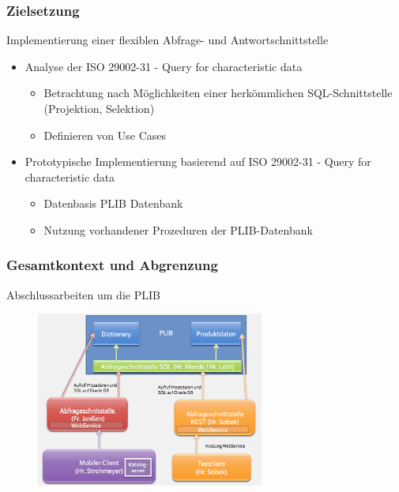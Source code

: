 \documentclass[serif,mathserif]{beamer}
\begin{document}
\begin{frame}
  \frametitle{Zielsetzung}
  Implementierung einer flexiblen Abfrage- und Antwortschnittstelle 
  \begin{itemize}
  \item Analyse der ISO 29002-31 - Query for characteristic data
     \begin{itemize}
     \item Betrachtung nach Möglichkeiten einer herkömmlichen SQL-Schnittstelle (Projektion, Selektion)
     \item Definieren von Use Cases
     \end{itemize}
  \item Prototypische Implementierung basierend auf ISO 29002-31 - Query for characteristic data
      \begin{itemize}
      \item Datenbasis PLIB Datenbank
      \item Nutzung vorhandener Prozeduren der PLIB-Datenbank
      \end{itemize}
  \end{itemize}
\end{frame}

\begin{frame}
  \frametitle{Gesamtkontext und Abgrenzung}
    Abschlussarbeiten um die PLIB
  \begin{figure}[t]
    \includegraphics[width=7.5cm]{images/gesamtkontext_plib.png}
  \end{figure}
\end{frame}
\end{document}
